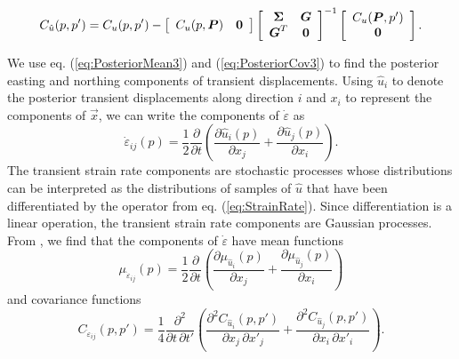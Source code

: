 \documentclass[extra,mreferee]{gji}
\begin{document}
\begin{equation}\label{eq:PosteriorCov3}
C_{\hat{u}}(p,p') = C_u(p,p') - 
                    \left[\begin{array}{cc}
                          C_u(p,\mitbf{P}) & \mitbf{0} \\
                          \end{array}\right]
                    \left[\begin{array}{cc}
                          \mitbf{\Sigma} & \mitbf{G} \\
                          \mitbf{G}^T  & \mitbf{0} \\
                          \end{array}\right]^{-1}
                    \left[\begin{array}{c}
                          C_u(\mitbf{P},p') \\
                          \mitbf{0} \\
                          \end{array}\right].
\end{equation}

We use eq. (\ref{eq:PosteriorMean3}) and (\ref{eq:PosteriorCov3}) to find the posterior easting and northing components of transient displacements. Using $\hat{u}_i$ to denote the posterior transient displacements along direction $i$ and $x_i$ to represent the components of $\vec{x}$, we can write the components of $\dot\varepsilon$ as 
\begin{equation}\label{eq:StrainRate}
\dot\varepsilon_{ij}(p) = \frac{1}{2} \frac{\partial}{\partial t} \left(
                                        \frac{\partial \hat{u}_i(p)}{\partial x_j} +  
                                        \frac{\partial \hat{u}_j(p)}{\partial x_i}\right).
\end{equation}
The transient strain rate components are stochastic processes whose distributions can be interpreted as the distributions of samples of $\hat{u}$ that have been differentiated by the operator from eq. (\ref{eq:StrainRate}). Since differentiation is a linear operation, the transient strain rate components are Gaussian processes. From \citet[sec. 10.2]{Papoulis1991}, we find that the components of $\dot{\varepsilon}$ have mean functions
\begin{equation}\label{eq:StrainMean}
\mu_{\dot\varepsilon_{ij}}(p) = \frac{1}{2}\frac{\partial}{\partial t}\left(
                                  \frac{\partial \mu_{\hat{u}_i}(p)}{\partial x_j} + 
                                  \frac{\partial \mu_{\hat{u}_j}(p)}{\partial x_i} \right)
\end{equation} 
and covariance functions
\begin{equation}\label{eq:StrainCov}
C_{\dot\varepsilon_{ij}}(p,p') = \frac{1}{4} \frac{\partial^2}{\partial t \, \partial t'}\left(
                                   \frac{\partial^2 C_{\hat{u}_i}(p,p')}{\partial x_j \, \partial x'_j} + 
                                   \frac{\partial^2 C_{\hat{u}_j}(p,p')}{\partial x_i \, \partial x'_i} \right).
\end{equation} 
\end{document}
